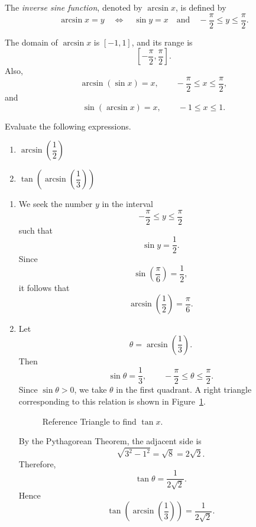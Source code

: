 \begin{definition}
The \emph{inverse sine function}, denoted by \(\arcsin x\), is defined by
\[
\arcsin x=y
\quad \Longleftrightarrow \quad
\sin y=x
\quad \text{and} \quad
-\frac{\pi}{2}\le y\le \frac{\pi}{2}.
\]
\end{definition}

\begin{remark}
The domain of \(\arcsin x\) is \([-1,1]\), and its range is
\[
\left[-\frac{\pi}{2},\frac{\pi}{2}\right].
\]
Also,
\[
\arcsin(\sin x)=x,
\qquad -\frac{\pi}{2}\le x\le \frac{\pi}{2},
\]
and
\[
\sin(\arcsin x)=x,
\qquad -1\le x\le 1.
\]
\end{remark}

\begin{example}
Evaluate the following expressions.
\begin{enumerate}
    \item \(\arcsin\left(\dfrac{1}{2}\right)\)
    \item \(\tan\left(\arcsin\left(\dfrac{1}{3}\right)\right)\)
\end{enumerate}
\end{example}

\begin{solution}
\leavevmode
\begin{enumerate}
    \item We seek the number \(y\) in the interval
    \[
    -\frac{\pi}{2}\le y\le \frac{\pi}{2}
    \]
    such that
    \[
    \sin y=\frac{1}{2}.
    \]
    Since
    \[
    \sin\left(\frac{\pi}{6}\right)=\frac{1}{2},
    \]
    it follows that
    \[
    \arcsin\left(\frac{1}{2}\right)=\frac{\pi}{6}.
    \]

    \item Let
    \[
    \theta=\arcsin\left(\frac{1}{3}\right).
    \]
    Then
    \[
    \sin\theta=\frac{1}{3},
    \qquad
    -\frac{\pi}{2}\le \theta\le \frac{\pi}{2}.
    \]
    Since \(\sin\theta>0\), we take \(\theta\) in the first quadrant. A right triangle corresponding to this relation is shown in Figure~\ref{fig:tan-arcsin-triangle}.

    \begin{figure}[tbp]
    \centering
    \caption{Reference Triangle to find \(\tan x\).}
    \label{fig:tan-arcsin-triangle}
    \end{figure}

    By the Pythagorean Theorem, the adjacent side is
    \[
    \sqrt{3^{2}-1^{2}}=\sqrt{8}=2\sqrt{2}.
    \]
    Therefore,
    \[
    \tan\theta=\frac{1}{2\sqrt{2}}.
    \]
    Hence
    \[
    \tan\left(\arcsin\left(\frac{1}{3}\right)\right)=\frac{1}{2\sqrt{2}}.
    \]
\end{enumerate}
\end{solution}

